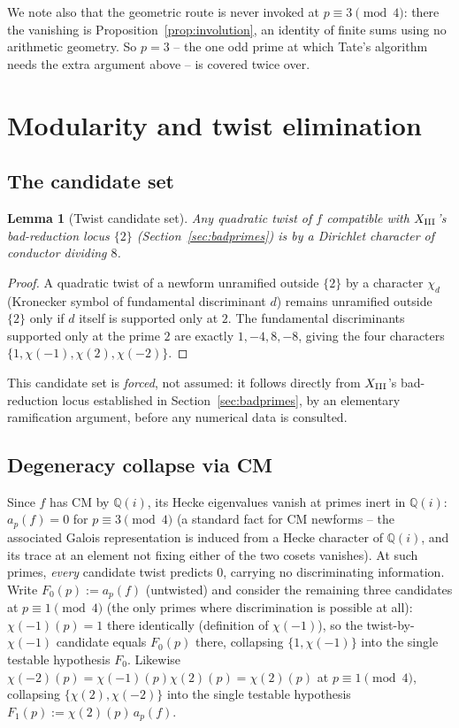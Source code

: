 \documentclass[11pt]{amsart}
\newtheorem{lemma}[theorem]{Lemma}
\theoremstyle{definition}
\newcommand{\Q}{\mathbb{Q}}
\begin{document}
We note also that the geometric route is never invoked at
$p\equiv3\pmod4$: there the vanishing is
Proposition~\ref{prop:involution}, an identity of finite sums using no
arithmetic geometry. So $p=3$ -- the one odd prime at which Tate's
algorithm needs the extra argument above -- is covered twice over.

\section{Modularity and twist elimination}
\label{sec:twist}

\subsection{The candidate set}

\begin{lemma}[Twist candidate set]
\label{lem:twist-set}
Any quadratic twist of $f$ compatible with $X_{\rm III}$'s bad-reduction
locus $\{2\}$ (Section~\ref{sec:badprimes}) is by a Dirichlet character of
conductor dividing $8$.
\end{lemma}

\begin{proof}
A quadratic twist of a newform unramified outside $\{2\}$ by a character
$\chi_d$ (Kronecker symbol of fundamental discriminant $d$) remains
unramified outside $\{2\}$ only if $d$ itself is supported only at $2$.
The fundamental discriminants supported only at the prime $2$ are exactly
$1,-4,8,-8$, giving the four characters $\{1,\chi(-1),\chi(2),\chi(-2)\}$.
\end{proof}

This candidate set is \emph{forced}, not assumed: it follows directly from
$X_{\rm III}$'s bad-reduction locus established in Section~\ref{sec:badprimes},
by an elementary ramification argument, before any numerical data is
consulted.

\subsection{Degeneracy collapse via CM}

Since $f$ has CM by $\Q(i)$, its Hecke eigenvalues vanish at primes inert
in $\Q(i)$: $a_p(f)=0$ for $p\equiv3\pmod4$ (a standard fact for CM
newforms -- the associated Galois representation is induced from a Hecke
character of $\Q(i)$, and its trace at an element not fixing either of
the two cosets vanishes). At such primes, \emph{every} candidate twist
predicts $0$, carrying no discriminating information. Write
$F_0(p):=a_p(f)$ (untwisted) and consider the remaining three candidates
at $p\equiv1\pmod4$ (the only primes where discrimination is possible at
all): $\chi(-1)(p)=1$ there identically (definition of $\chi(-1)$), so the
twist-by-$\chi(-1)$ candidate equals $F_0(p)$ there, collapsing $\{1,
\chi(-1)\}$ into the single testable hypothesis $F_0$. Likewise
$\chi(-2)(p)=\chi(-1)(p)\chi(2)(p)=\chi(2)(p)$ at $p\equiv1\pmod4$,
collapsing $\{\chi(2),\chi(-2)\}$ into the single testable hypothesis
$F_1(p):=\chi(2)(p)\,a_p(f)$.
\end{document}
